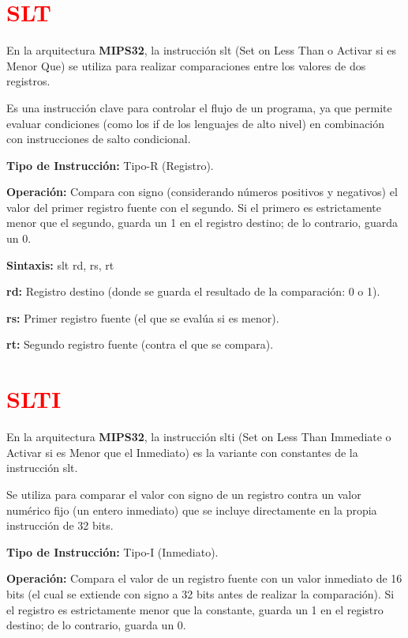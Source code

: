 \documentclass[12pt,a4paper]{article}
\begin{document}
\section{\textcolor{red}{SLT}}

En la arquitectura \textbf{MIPS32}, la instrucción slt (Set on Less Than o Activar si es Menor Que) se utiliza para realizar comparaciones entre los valores de dos registros.

Es una instrucción clave para controlar el flujo de un programa, ya que permite evaluar condiciones (como los if de los lenguajes de alto nivel) en combinación con instrucciones de salto condicional.

\textbf{Tipo de Instrucción:} Tipo-R (Registro).

\textbf{Operación:} Compara con signo (considerando números positivos y negativos) el valor del primer registro fuente con el segundo. Si el primero es estrictamente menor que el segundo, guarda un 1 en el registro destino; de lo contrario, guarda un 0.

\textbf{Sintaxis:} slt rd, rs, rt

\textbf{rd:} Registro destino (donde se guarda el resultado de la comparación: 0 o 1).

\textbf{rs:} Primer registro fuente (el que se evalúa si es menor).

\textbf{rt:} Segundo registro fuente (contra el que se compara).

\section{\textcolor{red}{SLTI}}

En la arquitectura \textbf{MIPS32}, la instrucción slti (Set on Less Than Immediate o Activar si es Menor que el Inmediato) es la variante con constantes de la instrucción slt.

Se utiliza para comparar el valor con signo de un registro contra un valor numérico fijo (un entero inmediato) que se incluye directamente en la propia instrucción de 32 bits.

\textbf{Tipo de Instrucción:} Tipo-I (Inmediato).

\textbf{Operación:} Compara el valor de un registro fuente con un valor inmediato de 16 bits (el cual se extiende con signo a 32 bits antes de realizar la comparación). Si el registro es estrictamente menor que la constante, guarda un 1 en el registro destino; de lo contrario, guarda un 0.
\end{document}
